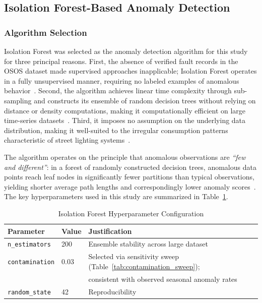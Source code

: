 \documentclass{article}
\begin{document}

\subsection{Isolation Forest-Based Anomaly Detection}
\label{subsec:iforest_hourly}
\subsubsection{Algorithm Selection}

Isolation Forest was selected as the anomaly detection algorithm for
this study for three principal reasons. First, the absence of verified
fault records in the OSOS dataset made supervised approaches
inapplicable; Isolation Forest operates in a fully unsupervised
manner, requiring no labeled examples of anomalous
behavior~\cite{liu2008isolation}. Second, the algorithm achieves
linear time complexity through sub-sampling and constructs its
ensemble of random decision trees without relying on distance or
density computations, making it computationally efficient on large
time-series datasets~\cite{liu2012isolation}. Third, it imposes no
assumption on the underlying data distribution, making it well-suited
to the irregular consumption patterns characteristic of street
lighting systems~\cite{chandola2009anomaly, ptacek2022road,
nespoli2024street}.

The algorithm operates on the principle that anomalous observations
are \textit{``few and different''}: in a forest of randomly
constructed decision trees, anomalous data points reach leaf nodes in
significantly fewer partitions than typical observations, yielding
shorter average path lengths and correspondingly lower anomaly
scores~\cite{liu2008isolation}. The key hyperparameters used in this
study are summarized in Table~\ref{tab:if_params}.

\begin{table}[h]
\centering
\caption{Isolation Forest Hyperparameter Configuration}
\label{tab:if_params}
\begin{tabular}{lll}
\hline
\textbf{Parameter} & \textbf{Value} & \textbf{Justification} \\
\hline
\texttt{n\_estimators}  & 200  & Ensemble stability across large dataset \\
\texttt{contamination}  & 0.03 & Selected via sensitivity sweep (Table~\ref{tab:contamination_sweep}); \\
                        &      & consistent with observed seasonal anomaly rates \\
\texttt{random\_state}  & 42   & Reproducibility \\
\hline
\end{tabular}
\end{table}
\end{document}
